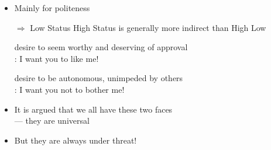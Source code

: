 \documentclass[headrule,footrule]{foils}
\newcommand{\PF}[1]{\Smiley[#1][green]}
\newcommand{\NF}[1]{\Annoey[#1][red]}
\begin{document}

\begin{itemize}
\item Mainly for politeness

  \begin{exe}
    \begin{xlist}
      \ex {}
    \end{xlist}
    \begin{xlist}
      \ex {}
    \end{xlist}
    \begin{xlist}
      \ex {}
    \end{xlist}
  \end{exe}
\item[$\Rightarrow$] Low Status \into High Status is generally more indirect than High \into Low 
\end{itemize}


\begin{itemize}
\item[\PF{2}]  desire to seem worthy and deserving of approval
  \\ : I want you to like me!
\bigskip\bigskip\bigskip
\item[\NF{2}]  desire to be autonomous, unimpeded by others
  \\ : I want you not to bother me!
\bigskip\bigskip\bigskip
\item It is argued that we all have these two faces
  \\ --- they are universal
\item But they are always under threat!

\end{itemize}

\end{document}

